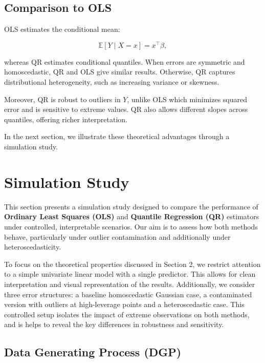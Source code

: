 \documentclass[fleqn,10pt]{latex/stylish_article} %
\begin{document}
\subsection{Comparison to OLS}\label{comparison-to-ols}

OLS estimates the conditional mean:

\[
\mathbb{E}[Y \mid X = x] = x^\top \beta,
\]

whereas QR estimates conditional quantiles. When errors are symmetric and homoscedastic, QR and OLS give similar results. Otherwise, QR captures distributional heterogeneity, such as increasing variance or skewness.

Moreover, QR is robust to outliers in \(Y\), unlike OLS which minimizes squared error and is sensitive to extreme values. QR also allows different slopes across quantiles, offering richer interpretation.

In the next section, we illustrate these theoretical advantages through a simulation study.

\section{Simulation Study}\label{simulation-study}

This section presents a simulation study designed to compare the performance of \textbf{Ordinary Least Squares (OLS)} and \textbf{Quantile Regression (QR)} estimators under controlled, interpretable scenarios. Our aim is to assess how both methods behave, particularly under outlier contamination and additionally under heteroscedasticity.

To focus on the theoretical properties discussed in Section 2, we restrict attention to a simple univariate linear model with a single predictor. This allows for clean interpretation and visual representation of the results. Additionally, we consider three error structures: a baseline homoscedastic Gaussian case, a contaminated version with outliers at high-leverage points and a heteroscedastic case. This controlled setup isolates the impact of extreme observations on both methods, and is helps to reveal the key differences in robustness and sensitivity.

\subsection{Data Generating Process (DGP)}\label{data-generating-process-dgp}
\end{document}
